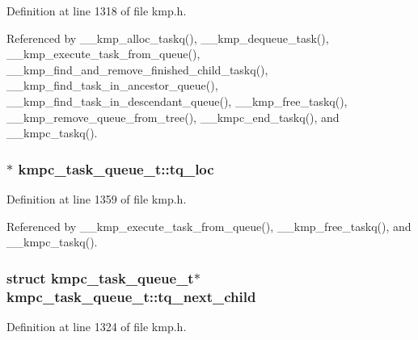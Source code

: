 Definition at line 1318 of file kmp.\-h.



Referenced by \-\_\-\-\_\-kmp\-\_\-alloc\-\_\-taskq(), \-\_\-\-\_\-kmp\-\_\-dequeue\-\_\-task(), \-\_\-\-\_\-kmp\-\_\-execute\-\_\-task\-\_\-from\-\_\-queue(), \-\_\-\-\_\-kmp\-\_\-find\-\_\-and\-\_\-remove\-\_\-finished\-\_\-child\-\_\-taskq(), \-\_\-\-\_\-kmp\-\_\-find\-\_\-task\-\_\-in\-\_\-ancestor\-\_\-queue(), \-\_\-\-\_\-kmp\-\_\-find\-\_\-task\-\_\-in\-\_\-descendant\-\_\-queue(), \-\_\-\-\_\-kmp\-\_\-free\-\_\-taskq(), \-\_\-\-\_\-kmp\-\_\-remove\-\_\-queue\-\_\-from\-\_\-tree(), \-\_\-\-\_\-kmpc\-\_\-end\-\_\-taskq(), and \-\_\-\-\_\-kmpc\-\_\-taskq().

\hypertarget{structkmpc__task__queue__t_aea2c340b635e160e01da0567adaf247d}{
\subsubsection[{tq\-\_\-loc}]{$\ast$ kmpc\-\_\-task\-\_\-queue\-\_\-t\-::tq\-\_\-loc}}\label{structkmpc__task__queue__t_aea2c340b635e160e01da0567adaf247d}


Definition at line 1359 of file kmp.\-h.



Referenced by \-\_\-\-\_\-kmp\-\_\-execute\-\_\-task\-\_\-from\-\_\-queue(), \-\_\-\-\_\-kmp\-\_\-free\-\_\-taskq(), and \-\_\-\-\_\-kmpc\-\_\-taskq().

\hypertarget{structkmpc__task__queue__t_ac3bcbe8f1494d5a1010ff0009aa2d3e7}{
\subsubsection[{tq\-\_\-next\-\_\-child}]{\setlength{\rightskip}{0pt plus 5cm}struct {\bf kmpc\-\_\-task\-\_\-queue\-\_\-t}$\ast$ kmpc\-\_\-task\-\_\-queue\-\_\-t\-::tq\-\_\-next\-\_\-child}}\label{structkmpc__task__queue__t_ac3bcbe8f1494d5a1010ff0009aa2d3e7}


Definition at line 1324 of file kmp.\-h.




